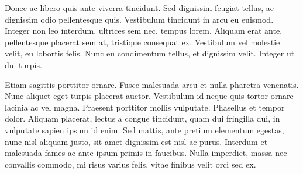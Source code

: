 \documentclass[11pt,a4paper,sans]{moderncv}
\begin{document}
Donec ac libero quis ante viverra tincidunt. Sed dignissim feugiat tellus, ac
dignissim odio pellentesque quis. Vestibulum tincidunt in arcu eu euismod.
Integer non leo interdum, ultrices sem nec, tempus lorem. Aliquam erat ante,
pellentesque placerat sem at, tristique consequat ex. Vestibulum vel molestie
velit, eu lobortis felis. Nunc eu condimentum tellus, et dignissim velit.
Integer ut dui turpis.

Etiam sagittis porttitor ornare. Fusce malesuada arcu et nulla pharetra
venenatis. Nunc aliquet eget turpis placerat auctor. Vestibulum id neque quis
tortor ornare lacinia ac vel magna. Praesent porttitor mollis vulputate.
Phasellus et tempor dolor. Aliquam placerat, lectus a congue tincidunt, quam dui
fringilla dui, in vulputate sapien ipsum id enim. Sed mattis, ante pretium
elementum egestas, nunc nisl aliquam justo, sit amet dignissim est nisl ac
purus. Interdum et malesuada fames ac ante ipsum primis in faucibus. Nulla
imperdiet, massa nec convallis commodo, mi risus varius felis, vitae finibus
velit orci sed ex.

\makeletterclosing
\end{document}
